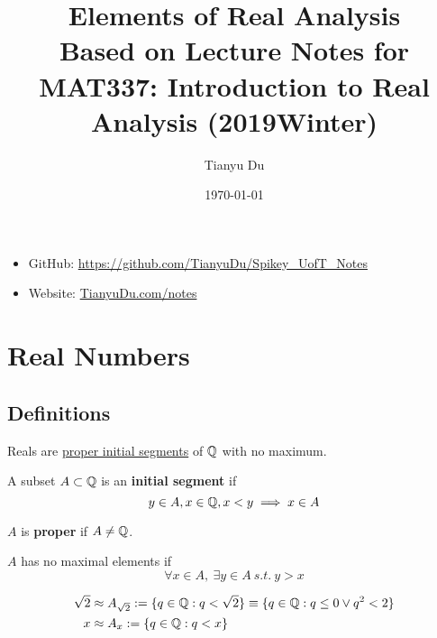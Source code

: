 \documentclass[11pt]{article}
\title{Elements of Real Analysis \\ \small Based on Lecture Notes for MAT337: Introduction to Real Analysis (2019Winter)}
\date{\today}
\author{Tianyu Du}
\begin{document}
	\maketitle
	\doclicenseThis
	\begin{itemize}
		\item GitHub: \url{https://github.com/TianyuDu/Spikey_UofT_Notes}
		\item Website: \url{TianyuDu.com/notes}
	\end{itemize}
	\tableofcontents
	\newpage
	
    \section{Real Numbers}
        \subsection{Definitions}
        \begin{definition}
            Reals are \ul{proper initial segments} of $\mathbb{Q}$ with no maximum.
        \end{definition}
    
        \begin{definition}
            A subset $A \subset \mathbb{Q}$ is an \textbf{initial segment} if 
            \begin{equation}
                y \in A, x \in \mathbb{Q}, x < y \implies x \in A
            \end{equation}
        \end{definition}
	   
        \begin{definition}
            $A$ is \textbf{proper} if $A \neq \mathbb{Q}$.
        \end{definition}
        
        \begin{definition}
            $A$ has no maximal elements if 
            \begin{equation}
                \forall x \in A,\ \exists y \in A\ s.t.\ y > x
            \end{equation}
        \end{definition}
        
        \begin{example}
            \begin{align}
                \sqrt{2} &\approx A_{\sqrt{2}} := \{q \in \mathbb{Q}: q < \sqrt{2}\} \equiv \{q \in \mathbb{Q}: q \leq 0 \lor q^2 < 2\} \\
                x &\approx A_x := \{q \in \mathbb{Q}: q < x\}
            \end{align}
        \end{example}
        
\end{document}
